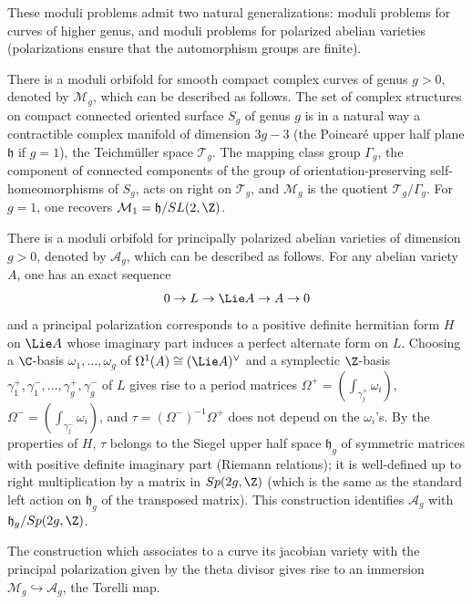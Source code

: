 \begin{para}\label{para:1.1.3}
 These moduli problems admit two natural generalizations: moduli
 problems for curves of higher genus, and moduli problems for polarized
 abelian varieties (polarizations ensure that the automorphism groups
 are finite).

 There is a moduli orbifold for smooth compact complex curves of genus
 $g>0$, denoted by $\mathcal{M}_g$, which can be described as
 follows. The set of complex structures on compact connected oriented
 surface $S_g$ of genus $g$ is in a natural way a contractible complex
 manifold of dimension $3g-3$ (\resp the Poincar\'e upper half plane
 $\mathfrak{h}$ if $g=1$), the Teichm\"uller space $\mathcal{T}_g$. The
 mapping class group $\Gamma_g$, \ie the component of connected
 components of the group of orientation-preserving self-homeomorphisms of
 $S_g$, acts on right on $\mathcal{T}_g$, and $\mathcal{M}_g$ is the
 quotient $\mathcal{T}_g/\Gamma_g$. For $g=1$, one recovers
 $\mathcal{M}_1=\mathfrak{h}/SL(2,{\Z})$.


There is a moduli orbifold for principally polarized abelian varieties of
dimension
$g>0$, denoted by $\mathcal{A}_g$, which can be described as follows. For any
abelian variety $A$, one has an exact sequence 
\begin{equation*}
 0\rightarrow L\rightarrow \Lie A\rightarrow A\rightarrow 0
\end{equation*}
and a principal polarization corresponds to a positive
definite hermitian form $H$ on $\Lie A$ whose imaginary part induces a
perfect alternate form on $L$. Choosing a $\C$-basis
$\omega_1,\ldots,\omega_g$ of $\Omega^1(A)\cong (\Lie A)^\vee$ and a
symplectic $\Z$-basis $\gamma_1^+,\gamma_1^-,\ldots,\gamma_g^+,
\gamma_g^-$ of $L$ gives rise to a period matrices 
$\Omega^+=(\int_{\gamma^+_j}\omega_i)$, $\Omega^-=(\int_{\gamma^-_j}\omega_i)$,
and $\tau=(\Omega^-)^{-1}\Omega^+$ does not depend on the
$\omega_i$'s.  By the properties of $H$, $\tau$ belongs to the Siegel
upper half space $\mathfrak{h}_g$ of symmetric matrices with positive
definite imaginary part (Riemann relations); it is well-defined up to
right multiplication by a matrix in $Sp(2g,{\Z})$ (which is the same as
the standard left action on $\mathfrak{h}_g$ of the transposed
matrix). This construction identifies $\mathcal{A}_g$ with
$\mathfrak{h}_g/Sp(2g,{\Z})$.


The construction which associates to a curve its jacobian variety with
the principal polarization given by the theta divisor gives rise to an
immersion $\mathcal{M}_g\hookrightarrow\mathcal{A}_g$, the Torelli map.
\end{para}

